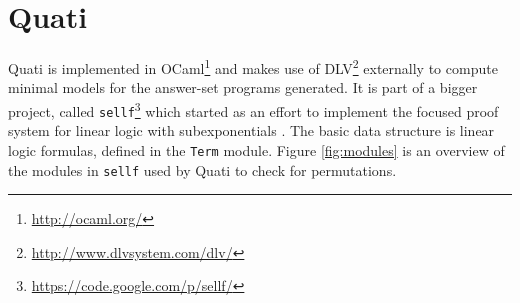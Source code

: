 \documentclass{llncs}
\begin{document}
% 
% 

\section{Quati}
\label{sec:quati}


Quati is implemented in OCaml\footnote{\url{http://ocaml.org/}} and makes use of
DLV\footnote{\url{http://www.dlvsystem.com/dlv/}} externally to compute minimal models for the
answer-set programs generated. It is part of a bigger project, called
\texttt{sellf}\footnote{\url{https://code.google.com/p/sellf/}} which started as an effort to
implement the focused proof system for linear logic with subexponentials
\cite{vivek's thesis}. The basic data structure is linear logic formulas,
defined in the \texttt{Term} module. Figure \ref{fig:modules} is an overview
of the modules in \texttt{sellf} used by Quati to check for permutations.
\end{document}
